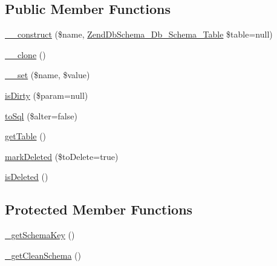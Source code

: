 \subsection*{Public Member Functions}
\begin{DoxyCompactItemize}
\item 
\hyperlink{classZendDbSchema__Db__Schema__Table__AbstractDefinition_afe6a6cfdfa739f1feea4dbd8b6122550}{\-\_\-\-\_\-construct} (\$name, \hyperlink{classZendDbSchema__Db__Schema__Table}{Zend\-Db\-Schema\-\_\-\-Db\-\_\-\-Schema\-\_\-\-Table} \$table=null)
\item 
\hyperlink{classZendDbSchema__Db__Schema__Table__AbstractDefinition_aff0739c3d85d7d6c27944a7fee2d0f38}{\-\_\-\-\_\-clone} ()
\item 
\hyperlink{classZendDbSchema__Db__Schema__Table__AbstractDefinition_a65498451683b2cf8fd1dc65f7f03581d}{\-\_\-\-\_\-set} (\$name, \$value)
\item 
\hyperlink{classZendDbSchema__Db__Schema__Table__AbstractDefinition_a92b77fa23ce49db1c39edcc583ec6cfe}{is\-Dirty} (\$param=null)
\item 
\hyperlink{classZendDbSchema__Db__Schema__Table__AbstractDefinition_a75c1b3ef1005c2d6aa371ecef07d530d}{to\-Sql} (\$alter=false)
\item 
\hyperlink{classZendDbSchema__Db__Schema__Table__AbstractDefinition_a224b6a0c1df1d6ed40e03657782ef6fc}{get\-Table} ()
\item 
\hyperlink{classZendDbSchema__Db__Schema__Table__AbstractDefinition_a018fe3e134417675da482608579910a5}{mark\-Deleted} (\$to\-Delete=true)
\item 
\hyperlink{classZendDbSchema__Db__Schema__Table__AbstractDefinition_ae3276a6f60f556eb468d3f2ef102a3ab}{is\-Deleted} ()
\end{DoxyCompactItemize}
\subsection*{Protected Member Functions}
\begin{DoxyCompactItemize}
\item 
\hyperlink{classZendDbSchema__Db__Schema__Table__AbstractDefinition_a2fb894602c4b7fbba5dd1d180f93c181}{\-\_\-get\-Schema\-Key} ()
\item 
\hyperlink{classZendDbSchema__Db__Schema__Table__AbstractDefinition_a355febe0ff6ed1a3b95ae1edd91b807e}{\-\_\-get\-Clean\-Schema} ()
\end{DoxyCompactItemize}

